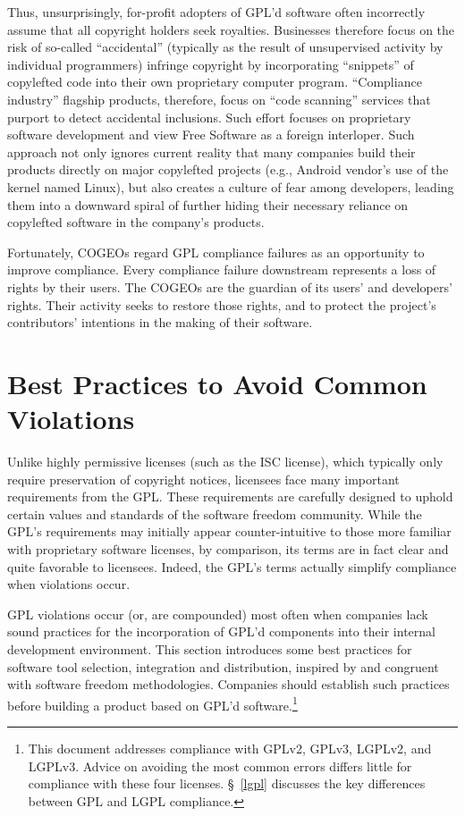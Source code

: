 Thus, unsurprisingly, for-profit adopters of GPL'd software often incorrectly
assume that all copyright holders seek royalties.  Businesses therefore focus
on the risk of so-called ``accidental'' (typically as the result of
unsupervised activity by individual programmers) infringe copyright by
incorporating ``snippets'' of copylefted code into their own proprietary
computer program.  ``Compliance industry'' flagship products, therefore,
focus on ``code scanning'' services that purport to detect accidental
inclusions.  Such effort focuses on proprietary software development and view
Free Software as a foreign interloper.  Such approach not only ignores
current reality that many companies build their products directly on major
copylefted projects (e.g., Android vendor's use of the kernel named Linux),
but also creates a culture of fear among developers, leading them into a
downward spiral of further hiding their necessary reliance on copylefted
software in the company's products.

Fortunately, COGEOs regard GPL compliance failures as an opportunity to
improve compliance.  Every compliance failure downstream represents a loss of
rights by their users. The COGEOs are the guardian of its users' and
developers' rights.  Their activity seeks to restore those rights, and
to protect the project's contributors' intentions in the making of their
software. 

\chapter{Best Practices to Avoid Common Violations}
\label{best-practices}

Unlike highly permissive licenses (such as the ISC license), which
typically only require preservation of copyright notices, licensees face many
important requirements from the GPL.  These requirements are
carefully designed to uphold certain values and standards of the software
freedom community.  While the GPL's requirements may initially appear
counter-intuitive to those more familiar with proprietary software
licenses, by comparison, its terms are in fact clear and quite favorable to
licensees.  Indeed, the GPL's terms actually simplify compliance when
violations occur.

GPL violations occur (or, are compounded) most often when companies lack sound
practices for the incorporation of GPL'd components into their
internal development environment.  This section introduces some best
practices for software tool selection, integration and distribution,
inspired by and congruent with software freedom methodologies.  Companies should
establish such practices before building a product based on GPL'd
software.\footnote{This document addresses compliance with GPLv2,
  GPLv3, LGPLv2, and LGPLv3.  Advice on avoiding the most common
  errors differs little for compliance with these four licenses.
  \S~\ref{lgpl} discusses the key differences between GPL and LGPL
  compliance.}

